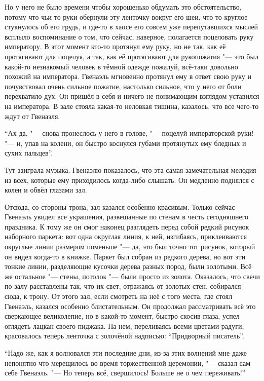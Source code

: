 Но у него не было времени чтобы хорошенько обдумать это обстоятельство, потому
что чьи-то руки обернули эту ленточку вокруг его шеи, что-то круглое стукнулось
об его грудь, и где-то в хаосе его совсем уже перепутавшихся мыслей всплыло
воспоминание о том, что сейчас, наверное, полагается поцеловать руку императору.
В этот момент кто-то протянул ему руку, но не так, как её протягивают для
поцелуя, а так, как её протягивают для рукопожатия "--- это был какой-то
незнакомый человек в тёмной одежде пожалуй, всё-таки довольно похожий на
императора.
Гвенаэль мгновенно протянул ему в ответ свою руку и почувствовал очень сильное
пожатие, настолько сильное, что у него от боли перехватило дух.
Он пришёл в себя и ничего не понимающим взглядом уставился на императора.
В зале стояла какая-то неловкая тишина, казалось, что все чего-то ждут от
Гвенаэля.

\enquote{Ах да, "--- снова пронеслось у него в голове, "--- поцелуй императорской
руки! "--- и, упав на колени, он быстро коснулся губами протянутых ему бледных
и сухих пальцев}.

Тут заиграла музыка.
Гвенаэлю показалось, что эта самая замечательная мелодия из всех, которые ему
приходилось когда-либо слышать.
Он медленно поднялся с колен и обвёл глазами зал.

Отсюда, со стороны трона, зал казался особенно красивым.
Только сейчас Гвенаэль увидел все украшения, развешанные по стенам в честь
сегодняшнего праздника.
К тому же он смог наконец разглядеть перед собой редкий рисунок наборного
паркета: вот одна округлая линия, к ней, изгибаясь, приклеиваются округлые линии
размером поменьше "--- да, это был точно тот рисунок, который он видел когда-то
в книжке.
Паркет был собран из редкого дерева, но вот эти тонкие линии, разделяющие
кусочки дерева разных пород, были золотыми.
Всё же остальное "--- стены, потолок "--- были просто из золота.
Оказалось, что свечи по залу расставлены так, что их свет, отражаясь от золотых
стен, собирался сюда, к трону.
От этого зал, если смотреть на неё с того места, где стоял Гвенаэль, казался
особенно блистательным.
Он продолжал рассматривать всё это сверкающее великолепие, но в какой-то момент,
быстро скосив глаза, успел оглядеть лацкан своего пиджака.
На нем, переливаясь всеми цветами радуги, красовалось теперь ленточка с
золочёной надписью: \enquote{Придворный писатель}.

\enquote{Надо же, как я волновался эти последние дни, из-за этих волнений мне
даже непонятно что мерещилось во время торжественной церемонии, "--- сказал сам
себе Гвенаэль.
"--- Но теперь всё, свершилось!
Больше не о чем переживать!}

